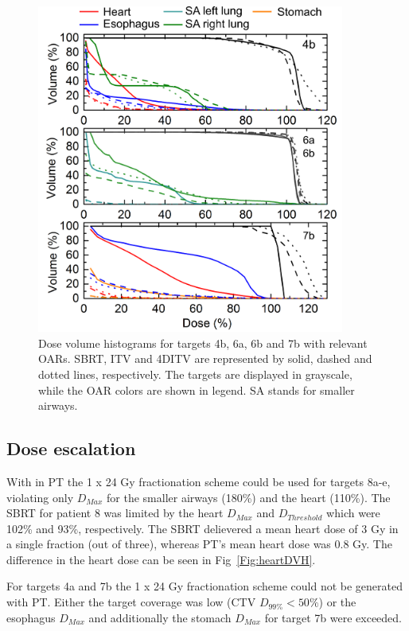 \newpage
\begin{figure}[H]
	\begin{center}
		\includegraphics[width=0.9\textwidth]{./ComplexPatients/Images/DVH_legend.png}
		\caption{Dose volume histograms for targets 4b, 6a, 6b and 7b with relevant OARs. SBRT, ITV and 4DITV are represented by solid, dashed and dotted lines, respectively. The targets are displayed
		in grayscale, while the OAR colors are shown in legend. SA stands for smaller airways.}
		\label{Fig:dvh}
	\end{center}
\end{figure}
\newpage


\subsection{Dose escalation}

With in PT the 1 x 24 Gy fractionation scheme could be used for targets 8a-e, violating only $D_{Max}$ for the smaller airways (180\%) and the heart (110\%).
The SBRT for patient 8 was limited by the heart $D_{Max}$ and $D_{Threshold}$ which were 102\% and 93\%, respectively. The SBRT delievered a mean heart dose of 
3 Gy in a single fraction (out of three), whereas PT's mean heart dose was 0.8 Gy.
The difference in the heart dose can be seen in Fig~\ref{Fig:heartDVH}.

For targets 4a and 7b the 1 x 24 Gy fractionation scheme could not be generated with PT. Either the target coverage was low (CTV $D_{99\%} < 50\%$) or the
esophagus $D_{Max}$ and additionally the stomach $D_{Max}$ for target 7b were exceeded.


